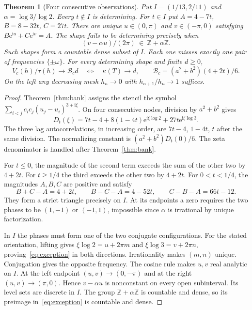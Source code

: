 \documentclass[11pt,letterpaper]{article}
\newtheorem{theorem}{Theorem}[section]
\newcommand{\Z}{\mathbb Z}
\newcommand{\ee}{\mathrm e}
\newcommand{\ii}{\mathrm i}
\newcommand{\BB}{\mathcal B}
\begin{document}
\begin{theorem}[Four consecutive observations]\label{thm:four}
Put $I=(1/13,2/11)$ and $\alpha=\log 3/\log 2$. Every $t\notin I$ is determining. For $t\in I$ put $A=4-7t$, $B=8-32t$, $C=27t$. There are unique $u\in(0,\pi)$ and $v\in(-\pi,0)$ satisfying $B\ee^{\ii u}+C\ee^{\ii v}=A$.
The shape fails to be determining precisely when
\begin{equation}\label{eq:exception}
 (v-\alpha u)/(2\pi)\ \in\ \Z+\alpha\Z .
\end{equation}
Such shapes form a countable dense subset of $I$. Each one misses exactly one pair of frequencies $\{\pm\omega\}$. For every determining shape and finite $d\ge0$,
\begin{equation}\label{eq:arith}
 V_c(h)/\tau(h)\longrightarrow \BB_c d
 \quad\Longleftrightarrow\quad \kappa(T)\longrightarrow d,\qquad
 \BB_c=(a^2+b^2)(4+2t)/6 .
\end{equation}
On the left any decreasing mesh $h_n\to0$ with $h_{n+1}/h_n\to1$ suffices.
\end{theorem}
\begin{proof}
Theorem~\ref{thm:bank} assigns the stencil the symbol $\sum_{i<j}c_ic_j(u_j-u_i)^{3+\ii\xi}$. On four consecutive nodes, division by $a^2+b^2$ gives
\begin{equation}\label{eq:symbol}
 D_t(\xi)=7t-4+8(1-4t)\ee^{\ii\xi\log2}+27t\ee^{\ii\xi\log3}.
\end{equation}
The three lag autocorrelations, in increasing order, are $7t-4$, $1-4t$, $t$ after the same division. The normalizing constant is $(a^2+b^2)D_t(0)/6$. The zeta denominator is handled after Theorem~\ref{thm:bank}.

For $t\le0$, the magnitude of the second term exceeds the sum of the other two by $4+2t$. For $t\ge1/4$ the third exceeds the other two by $4+2t$. For $0<t<1/4$, the magnitudes $A,B,C$ are positive and satisfy
\[
 B+C-A=4+2t,\qquad B-C-A=4-52t,\qquad C-B-A=66t-12 .
\]
They form a strict triangle precisely on $I$. At its endpoints a zero requires the two phases to be $(1,-1)$ or $(-1,1)$, impossible since $\alpha$ is irrational by unique factorization.

In $I$ the phases must form one of the two conjugate configurations. For the stated orientation, lifting gives $\xi\log2=u+2\pi m$ and $\xi\log3=v+2\pi n$, proving~\eqref{eq:exception} in both directions. Irrationality makes $(m,n)$ unique. Conjugation gives the opposite frequency. The cosine rule makes $u,v$ real analytic on $I$. At the left endpoint $(u,v)\to(0,-\pi)$ and at the right $(u,v)\to(\pi,0)$. Hence $v-\alpha u$ is nonconstant on every open subinterval. Its level sets are discrete in $I$. The group $\Z+\alpha\Z$ is countable and dense, so its preimage in~\eqref{eq:exception} is countable and dense.
\end{proof}
\end{document}
